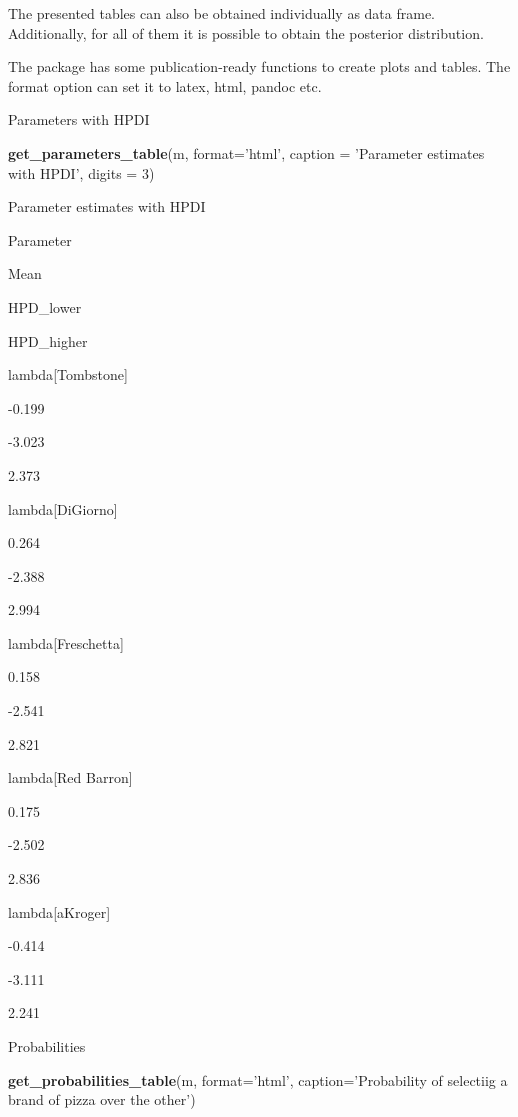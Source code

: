 \documentclass[
]{book}
\newenvironment{Shaded}{\begin{snugshade}}{\end{snugshade}}
\newcommand{\DataTypeTok}[1]{\textcolor[rgb]{0.13,0.29,0.53}{#1}}
\newcommand{\DecValTok}[1]{\textcolor[rgb]{0.00,0.00,0.81}{#1}}
\newcommand{\KeywordTok}[1]{\textcolor[rgb]{0.13,0.29,0.53}{\textbf{#1}}}
\newcommand{\NormalTok}[1]{#1}
\newcommand{\StringTok}[1]{\textcolor[rgb]{0.31,0.60,0.02}{#1}}
\begin{document}
The presented tables can also be obtained individually as data frame. Additionally, for all of them it is possible to obtain the posterior distribution.

The package has some publication-ready functions to create plots and tables. The format option can set it to latex, html, pandoc etc.

Parameters with HPDI

\begin{Shaded}
\begin{Highlighting}[]
\KeywordTok{get_parameters_table}\NormalTok{(m, }\DataTypeTok{format=}\StringTok{'html'}\NormalTok{, }\DataTypeTok{caption =} \StringTok{'Parameter estimates with HPDI'}\NormalTok{, }\DataTypeTok{digits =} \DecValTok{3}\NormalTok{)}
\end{Highlighting}
\end{Shaded}

\label{tab:unnamed-chunk-12}Parameter estimates with HPDI

Parameter

Mean

HPD\_lower

HPD\_higher

lambda{[}Tombstone{]}

-0.199

-3.023

2.373

lambda{[}DiGiorno{]}

0.264

-2.388

2.994

lambda{[}Freschetta{]}

0.158

-2.541

2.821

lambda{[}Red Barron{]}

0.175

-2.502

2.836

lambda{[}aKroger{]}

-0.414

-3.111

2.241

Probabilities

\begin{Shaded}
\begin{Highlighting}[]
\KeywordTok{get_probabilities_table}\NormalTok{(m, }\DataTypeTok{format=}\StringTok{'html'}\NormalTok{, }\DataTypeTok{caption=}\StringTok{'Probability of selectiig a brand of pizza over the other'}\NormalTok{)}
\end{Highlighting}
\end{Shaded}
\end{document}
